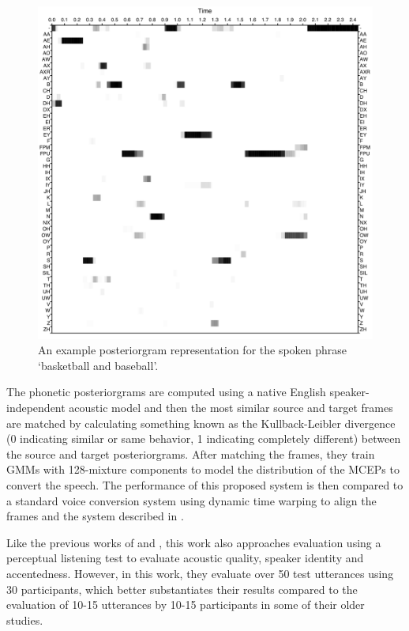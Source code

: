 \documentclass
[
    a4paper,
    twoside,
    12pt,
]
{report}
\begin{document}
\begin{figure}[H]
\centering
\includegraphics[scale=0.17]{img/phonetic-postgram.png}
\caption{An example posteriorgram representation for the spoken phrase `basketball and baseball'.}
\label{fig:phonetic-postgram}
\end{figure}

The phonetic posteriorgrams are computed using a native English
speaker-independent acoustic model and then the most similar source and
target frames are matched by calculating something known as the
Kullback-Leibler divergence (0 indicating similar or same behavior, 1
indicating completely different) between the source and target
posteriorgrams. After matching the frames, they train GMMs with
128-mixture components to model the distribution of the MCEPs to convert
the speech. The performance of this proposed system is then compared to
a standard voice conversion system using dynamic time warping to align
the frames and the system described in \textcite{aryal2014}.

Like the previous works of \textcite{aryal2014} and
\textcite{aryal2015}, this work also approaches evaluation using a
perceptual listening test to evaluate acoustic quality, speaker identity
and accentedness. However, in this work, they evaluate over 50 test
utterances using 30 participants, which better substantiates their
results compared to the evaluation of 10-15 utterances by 10-15
participants in some of their older studies.
\end{document}
